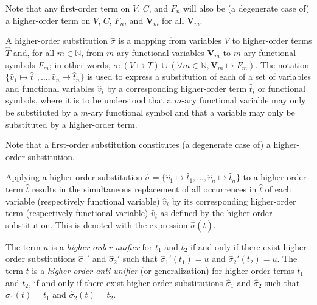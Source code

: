 Note that any first-order term on $V$, $C$, and $F_n$ will also be (a degenerate case of) a higher-order term on $V$, $C$, $F_n$, and $\mathbf{V}_m$ for all $\mathbf{V}_m$.

\begin{defn}\label{def:substitution}
A higher-order substitution $\hat{\sigma}$ is a mapping from variables $V$ to higher-order terms $\hat{T}$ and, for all $m\in\mathbb{N}$, from $m$-ary functional variables $\mathbf{V}_m$ to $m$-ary functional symbols $F_m$; in other words, $\sigma: (V\mapsto T)\cup(\forall m\in \mathbb{N}, \mathbf{V}_m\mapsto F_m)$. The notation $\{\hat{v}_1 \mapsto \hat{t}_1, \ldots, \hat{v}_n \mapsto \hat{t}_n\}$ is used to express a substitution of each of a set of variables and functional variables $\hat{v}_i$ by a corresponding higher-order term $\hat{t}_i$ or functional symbols, where it is to be understood that a $m$-ary functional variable may only be substituted by a $m$-ary functional symbol and that a variable may only be substituted by a higher-order term.
\end{defn}

Note that a first-order substitution constitutes (a degenerate case of) a higher-order substitution.

\begin{defn}\label{def:substitution}
Applying a higher-order substitution $\hat{\sigma} = \{\hat{v}_1 \mapsto \hat{t}_1, \ldots, \hat{v}_n \mapsto \hat{t}_n\}$ to a higher-order term $\hat{t}$ results in the simultaneous replacement of all occurrences in $\hat{t}$ of each variable (respectively functional variable) $\hat{v}_i$ by its corresponding higher-order term (respectively functional variable) $\hat{v}_i$ as defined by the higher-order substitution. This is denoted with the expression $\hat{\sigma}(\hat{t})$.
\end{defn}

\begin{defn}\label{def:generalization}
The term $u$ is a \emph{higher-order unifier} for $t_1$ and $t_2$ if and only if there exist higher-order substitutions $\hat{\sigma}_1'$ and $\hat{\sigma}_2'$ such that $\hat{\sigma}_1'(t_1)=u$ and $\hat{\sigma}_2'(t_2)=u$.  The term $t$ is a \emph{higher-order anti-unifier} (or generalization) for higher-order terms $t_1$ and $t_2$, if and only if there exist higher-order substitutions $\hat{\sigma}_1$ and $\hat{\sigma}_2$ such that $\hat{\sigma}_1(t)=t_1$ and $\hat{\sigma}_2(t)=t_2$.
\end{defn}

